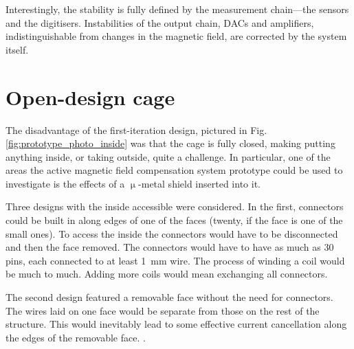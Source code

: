 Interestingly, the stability is fully defined by the measurement chain---the sensors and the digitisers. Instabilities of the output chain, DACs and amplifiers, indistinguishable from changes in the magnetic field, are corrected by the system itself.







\section{Open-design cage}
The disadvantage of the first-iteration design, pictured in Fig.\,\ref{fig:prototype_photo_inside} was that the cage is fully closed, making putting anything inside, or taking outside, quite a challenge. In particular, one of the areas the active magnetic field compensation system prototype could be used to investigate is the effects of a $\upmu$-metal shield inserted into it.

Three designs with the inside accessible were considered. In the first, connectors could be built in along edges of one of the faces (twenty, if the face is one of the small ones). To access the inside the connectors would have to be disconnected and then the face removed. The connectors would have to have as much as 30 pins, each connected to at least \SI{1}{\milli\meter} wire. 
 The process of winding a coil would be much to much.
Adding more coils would mean exchanging all connectors.

The second design featured a removable face without the need for connectors. The wires laid on one face would be separate from those on the rest of the structure. This would inevitably lead to some effective current cancellation along the edges of the removable face. .

